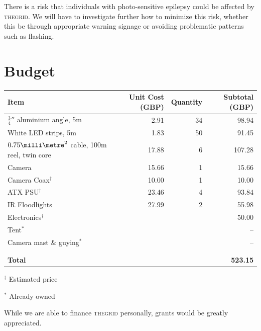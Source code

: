\documentclass[12pt]{article} %
\newcommand{\thegrid}{\textsc{the\textperiodcentered grid}\xspace}
\begin{document}
There is a risk that individuals with photo-sensitive epilepsy could be
affected by \thegrid.  We will have to investigate further how to minimize this
risk, whether this be through appropriate warning signage or avoiding
problematic patterns such as flashing.

\clearpage
\section{Budget}

\begin{table}[ht]
    \centering
    \begin{tabular}{l|r|r|r}
        Item & Unit Cost (GBP) & Quantity & Subtotal (GBP) \\
        \hline
        $\frac{3}{4}''$ aluminium angle, 5m & 2.91 & 34 & 98.94\\
                 White LED strips, 5m & 1.83 & 50 & 91.45\\
$0.75\milli\metre^2$ cable, 100m reel, twin core & 17.88 & 6 & 107.28\\
                               Camera & 15.66 & 1 & 15.66\\
                               Camera Coax$^\dagger$ & 10.00 & 1 & 10.00\\
                              ATX PSU$^\dagger$ & 23.46 & 4 & 93.84\\
                       IR Floodlights & 27.99 & 2 & 55.98\\
                          Electronics$^\dagger$ & & & 50.00\\
                    Tent$^\ast$ & & & --\\
                   Camera mast \& guying$^\ast$ & & & --\\

                                &&&\\
                                &&&\\

                 \textbf{Total} & & & \textbf{523.15}\\

    \end{tabular}
\end{table}

$^\dagger$ Estimated price

$^\ast$ Already owned

\vspace{2cm}

While we are able to finance \thegrid personally, grants would be greatly
appreciated.
\end{document}
